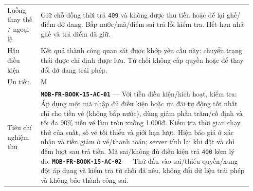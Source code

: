 \begin{longtable}{@{}P{0.23000\SRSWidth}P{0.77000\SRSWidth}@{}}
Luồng thay thế /\allowbreak{} ngoại lệ & Giữ chỗ đồng thời trả \texttt{409} và không được thu tiền hoặc để lại ghế/\allowbreak{}điểm dở dang. Bắp nước/\allowbreak{}mã/\allowbreak{}điểm sai trả lỗi kiểm tra. Hết hạn nhả ghế và trả điểm đã giữ. \\[3pt]
Hậu điều kiện & Kết quả thành công quan sát được khớp yêu cầu này; chuyển trạng thái được chỉ định được lưu. Từ chối không cấp quyền hoặc để thay đổi dở dang trái phép. \\[3pt]
Ưu tiên & M \\[3pt]
Tiêu chí nghiệm thu & \textbf{\texttt{MOB-\allowbreak{}FR-\allowbreak{}BOOK-\allowbreak{}15-\allowbreak{}AC-\allowbreak{}01}} — Với tiền điều kiện/\allowbreak{}kích hoạt, kiểm tra: Áp dụng một mã nhập đủ điều kiện hoặc ưu đãi tự động tốt nhất chỉ cho tiền vé (không bắp nước), dùng giảm phần trăm/\allowbreak{}cố định và tối đa 90\% tiền vé làm tròn xuống 1.000đ. Kiểm tra thời gian chạy, thứ của suất, số vé tối thiểu và giới hạn lượt. Hiện báo giá ở xác nhận và tiền giảm ở vé/\allowbreak{}thanh toán; server tính lại khi đặt và chỉ đếm lượt sau trả tiền. Mã sai/\allowbreak{}không đủ điều kiện trả \texttt{400} kèm lý do. \textbf{\texttt{MOB-\allowbreak{}FR-\allowbreak{}BOOK-\allowbreak{}15-\allowbreak{}AC-\allowbreak{}02}} — Thử đầu vào sai/\allowbreak{}thiếu quyền/\allowbreak{}xung đột áp dụng và kiểm tra từ chối đã nêu, không đổi dữ liệu trái phép và không báo thành công sai. \\[3pt]

\end{longtable}

